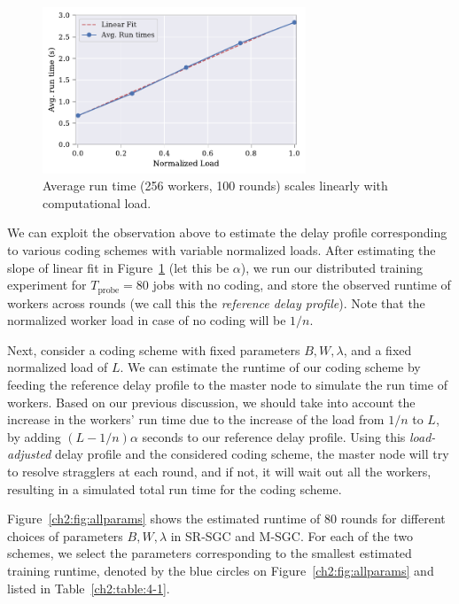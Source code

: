 \begin{figure}[h]
	\centering
	\includegraphics[width=0.7\textwidth]{figs/ch2/5.pdf}
	\caption{Average run time (256 workers, 100 rounds) scales linearly with computational load.}
	\label{ch2:fig:base_comp}
\end{figure}

We can exploit the observation above to estimate the delay profile corresponding to various coding schemes with variable normalized loads. After estimating the slope of linear fit in Figure~\ref{ch2:fig:base_comp} (let this be $\alpha$), we run our distributed training experiment for $T_\text{probe}=80$ jobs with no coding, and store the observed runtime of workers across rounds (we call this the \textit{reference delay profile}). Note that the normalized worker load in case of no coding will be $1/n$. 

Next, consider a coding scheme with fixed parameters $B, W, \lambda$, and a fixed normalized load of $L$. We can estimate the runtime of our coding scheme by feeding the reference delay profile to the master node to simulate the run time of workers. Based on our previous discussion, we should take into account the increase in the workers' run time due to the increase of the load from $1/n$ to $L$, by adding $(L - 1/n) \alpha$ seconds to our reference delay profile. Using this \textit{load-adjusted} delay profile and the considered coding scheme, the master node will try to resolve stragglers at each round, and if not, it will wait out all the workers, resulting in a simulated total run time for the coding scheme.

Figure~\ref{ch2:fig:allparams} shows the estimated runtime of $80$ rounds for different choices of parameters $B, W, \lambda$ in SR-SGC and M-SGC. For each of the two schemes, we select the parameters corresponding to the smallest estimated training runtime, denoted by the blue circles on Figure~\ref{ch2:fig:allparams} and listed in Table~\ref{ch2:table:4-1}. 



